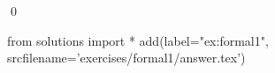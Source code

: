
\begin{ex} 
  \label{ex:formal1}
  
  \qed
\end{ex} 
\begin{python0}
from solutions import *
add(label="ex:formal1",
    srcfilename='exercises/formal1/answer.tex') 
\end{python0}
